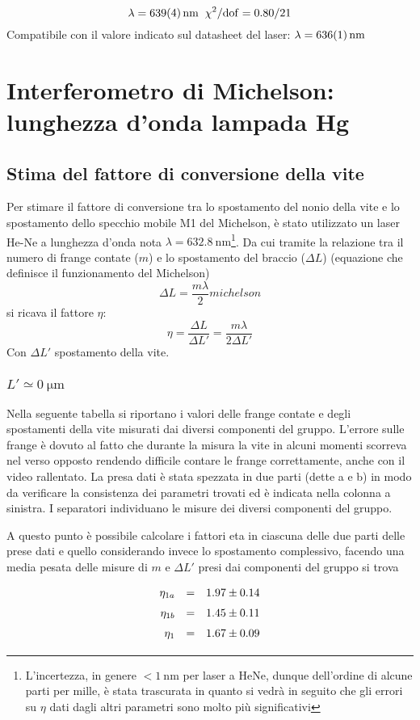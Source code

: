 \documentclass[10pt, a4paper, italian]{article}
\begin{document}
\[
{\lambda= \SI{639 \pm 4}{\nano \meter} \;\; \chi^2 /\mathrm{dof}=0.80/21}
\]
Compatibile con il valore indicato sul datasheet del laser: $\lambda=\SI{636\pm1}{\nano \meter}$

\section{Interferometro di Michelson: lunghezza d'onda lampada Hg}
\subsection{Stima del fattore di conversione della vite}
Per stimare il fattore di conversione tra lo spostamento del nonio della vite e lo spostamento dello specchio mobile M1 del Michelson, è stato utilizzato un laser He-Ne a lunghezza d'onda nota $\lambda= \SI{632.8}{\nano \meter}$\footnote{L'incertezza, in genere $<\SI{1}{\nano \meter}$ per laser a HeNe, dunque dell'ordine di alcune parti per mille, è stata trascurata in quanto si vedrà in seguito che gli errori su $\eta$ dati dagli altri parametri sono molto più significativi}. Da cui tramite la relazione tra il numero di frange contate ($m$) e lo spostamento del braccio ($\Delta L$) (equazione che definisce il funzionamento del Michelson)
\[
{\Delta L=\frac{m \lambda}{2}}{michelson}
\]
si ricava il fattore $\eta$:
\[
\eta=\frac{\Delta L}{\Delta L'}= \frac{m \lambda}{2 \Delta L'}
\]
Con $\Delta L'$ spostamento della vite. \newline
\subsubsection*{$L'\simeq \SI{0}{\micro \meter}$}
Nella seguente tabella si riportano i valori delle frange contate e degli spostamenti della vite misurati dai diversi componenti del gruppo. L'errore sulle frange è dovuto al fatto che durante la misura la vite in alcuni momenti scorreva nel verso opposto rendendo difficile contare le frange correttamente, anche con il video rallentato. La presa dati è stata spezzata in due parti (dette a e b) in modo da verificare la consistenza dei parametri trovati ed è indicata nella colonna a sinistra. I separatori individuano le misure dei diversi componenti del gruppo.

A questo punto è possibile calcolare i fattori eta in ciascuna delle due parti delle prese dati e quello considerando invece lo spostamento complessivo, facendo una media pesata delle misure di $m $ e $\Delta L'$ presi dai componenti del gruppo si trova
\[
\def\arraystretch{1.5}
\begin{array}{rcl}
\eta_{1a} & = & 1.97\pm 0.14\\
\eta_{1b} & = & 1.45\pm 0.11\\
\eta_{1}&=&1.67 \pm 0.09
\end{array}
\]
\end{document}
